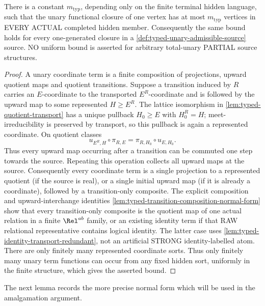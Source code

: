 \begin{lemma}
\label{lem:typed-unary-closure-bound}
There is a constant \(m_{\mathrm{typ}}\), depending only on
the finite terminal hidden language, such that the unary
functional closure of one vertex has at most
\(m_{\mathrm{typ}}\) vertices in EVERY ACTUAL completed
hidden member. Consequently the same bound holds for
every one-generated closure in a
\cref{def:typed-unary-admissible-source} source.
NO uniform bound is asserted for arbitrary total-unary
PARTIAL source structures.
\end{lemma}

\begin{proof}
A unary coordinate term is a finite composition of projections, upward
quotient maps and quotient transitions.  Suppose a transition induced by
\(R\) carries an \(E\)-coordinate to the transported
\(E^R\)-coordinate and is followed by the upward map to some represented
\(H\geq E^R\).  The lattice isomorphism in
\cref{lem:typed-quotient-transport} has a unique pullback
\(H_0\geq E\) with \(H_0^R=H\); meet-irreducibility is preserved by
transport, so this pullback is again a represented coordinate.  On quotient
classes
\[
  u_{E^R,H}\circ\pi_{R,E}
   =\pi_{R,H_0}\circ u_{E,H_0}.
\]
Thus every upward map occurring after a transition can be commuted one step
towards the source.  Repeating this operation collects all upward maps at the
source.  Consequently every coordinate term is a single projection to a
represented quotient (if the source is real), or a single initial upward map
(if it is already a coordinate), followed by a transition-only composite.
The explicit composition and
upward-interchange identities
\cref{lem:typed-transition-composition-normal-form}
show that every
transition-only composite
is the quotient map of
one actual relation
in a finite \(\Rel^{ab}\)
family, or an existing
identity term if that
RAW relational
representative contains
logical identity.
The latter case uses
\cref{lem:typed-identity-transport-redundant},
not an artificial STRONG
identity-labelled atom.
There are only finitely
many represented coordinate sorts.  Thus only finitely many unary term
functions can occur from any fixed hidden sort, uniformly in the finite
structure, which gives the asserted bound.
\end{proof}

The next lemma records the more precise normal form which will be used in the
amalgamation argument.

